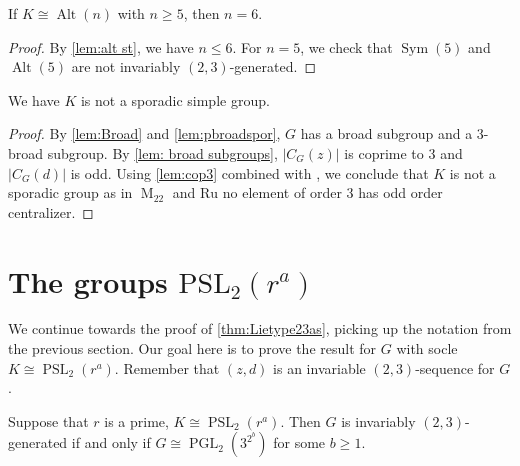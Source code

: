 \documentclass[12pt,a4paper]{amsart}
\DeclareMathOperator{\M}{M}
\DeclareMathOperator{\PGL}{PGL}
\DeclareMathOperator{\PSL}{PSL}
\DeclareMathOperator{\Alt}{Alt}
\DeclareMathOperator{\Sym}{Sym}
\begin{document}
\begin{lemma}\label{lem:alt gone}  If $K \cong \Alt(n)$ with $n \ge 5$, then $n=6$.
\end{lemma}


\begin{proof} By \cref{lem:alt st}, we have $n\le 6$. For $n=5$, we check that $\Sym(5)$ and $\Alt(5)$ are not invariably $(2,3)$-generated.
\end{proof}


\begin{lemma}\label{lem:sporadic gone} We have  $K$ is not a sporadic simple group.
\end{lemma}

 \begin{proof}   By \cref{lem:Broad} and \cref{lem:pbroadspor}, $G$ has a broad subgroup and a $3$-broad subgroup. By \cref{lem: broad subgroups}, $|C_G(z)|$ is coprime to $3$ and $|C_G(d)|$ is odd.
Using \cref{lem:cop3} combined with \cite[Tables 5.3]{GLS3}, we conclude that $K$  is not a sporadic group as in $\M_{22}$ and $\mathrm{Ru}$ no element of order $3$ has odd order centralizer.
 \end{proof}



\section{The groups $\mathrm{PSL}_2(r^a)$}\label{sec:6}

We continue towards the proof of \cref{thm:Lietype23as}, picking up the notation from the previous section.
Our goal here is to prove the result for $G$ with socle $K\cong \PSL_2(r^a)$. Remember that $(z,d)$ is an invariable $(2,3)$-sequence for $G$.

\begin{proposition}\label{lem:psl2}
 Suppose that $r$ is a prime, $K \cong \PSL_2(r^a)$. Then $G$ is invariably $(2,3)$-generated if and only if $G \cong \PGL_2(3^{2^b})$ for some $b\ge 1$.  \end{proposition}
\end{document}
